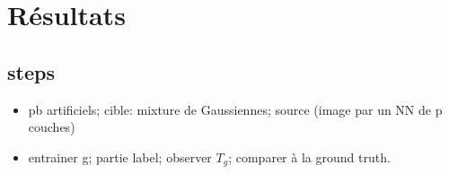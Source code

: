 \chapter{Résultats}
\section{steps}
\begin{itemize}
\item pb artificiels; cible: mixture de Gaussiennes; source (image par un NN de p couches)
\item entrainer g; partie label; observer $T_g$; comparer à la ground truth.
\end{itemize}


